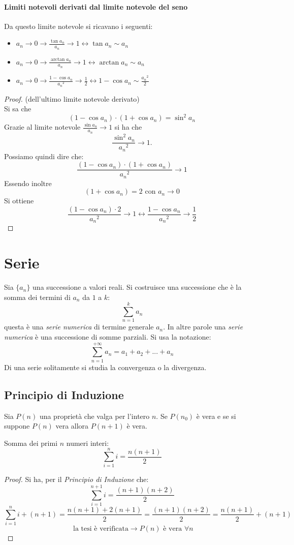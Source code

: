 \documentclass[a4paper,12pt, oneside]{book}
\begin{document}
\subsubsection{Limiti notevoli derivati dal limite notevole del seno}
Da questo limite notevole si ricavano i seguenti:
\begin{itemize}
\item $a_n\rightarrow 0 \longrightarrow \frac{\tan{a_n}}{a_n}\rightarrow 1 \longleftrightarrow \tan{a_n}\sim a_n$
\item $a_n\rightarrow 0 \longrightarrow \frac{\arctan{a_n}}{a_n}\rightarrow 1 \longleftrightarrow \arctan{a_n}\sim a_n$
\item $a_n\rightarrow 0 \longrightarrow \frac{1-\cos{a_n}}{{a_n}^{2}}\rightarrow \frac{1}{2} \longleftrightarrow 1-\cos{a_n}\sim \frac{{a_n}^{2}}{2}$
\end{itemize}
\begin{proof}(dell'ultimo limite notevole derivato)\\
Si sa che $$(1-\cos{a_n})\cdot(1+\cos{a_n})=\sin^2{a_n}$$
Grazie al limite notevole $\frac{\sin{a_n}}{a_n} \rightarrow 1$ si ha che $$\frac{\sin^2{a_n}}{{a_n}^{2}} \rightarrow 1.$$
Possiamo quindi dire che: $$\frac{(1-\cos{a_n})\cdot(1+\cos{a_n})}{{a_n}^{2}}\rightarrow 1$$
Essendo inoltre $$(1+\cos{a_n})=2 \mbox{ con } a_n\rightarrow 0$$
Si ottiene $$\frac{(1-\cos{a_n})\cdot 2}{{a_n}^{2}}\rightarrow 1 \longleftrightarrow \frac{1-\cos{a_n}}{{a_n}^{2}}\rightarrow \frac{1}{2} $$
\end{proof}

\chapter{Serie}
Sia $\{a_n\}$ una successione a valori reali. Si costruisce una successione che è la somma dei termini di $a_n$ da $1$ a $k$:
$$\sum_{n=1}^{k}a_n$$ 
questa è una \textit{serie numerica} di termine generale $a_n$.
In altre parole una \textit{serie numerica} è una successione di somme parziali. Si usa la notazione:$$\sum_{n=1}^{+\infty} a_n = a_1+a_2+...+a_n$$
Di una serie solitamente si studia la convergenza o la divergenza. 
\begin{shaded}
\section{Principio di Induzione}
Sia $P(n)$ una proprietà che valga per l'intero $n$. Se $P(n_0)$ è vera e se si suppone $P(n)$ vera allora $P(n+1)$ è vera.\\
\begin{esempio}
Somma dei primi $n$ numeri interi:
\begin{equation}
\sum_{i=1}^{n} i=\frac{n(n+1)}{2}
\end{equation}
\begin{proof}
Si ha, per il \textit{Principio di Induzione} che: $$ \sum_{i=1}^{n+1} i= \frac{(n+1)(n+2)}{2}$$ $$ \sum_{i=1}^{n} i+(n+1) = \frac{n(n+1)+2(n+1)}{2}=\frac{(n+1)(n+2)}{2}= \frac{n(n+1)}{2}+(n+1)$$ $$\mbox{ la tesi è verificata} \rightarrow P(n) \mbox{ è vera } \forall n$$
\end{proof}
\end{esempio}
\end{shaded}
\end{document}
